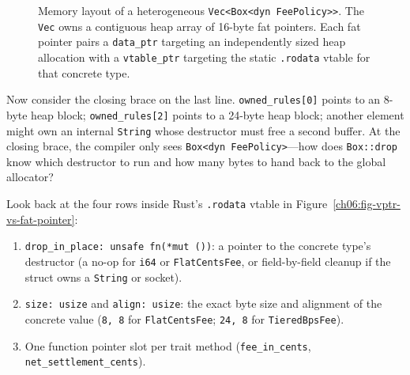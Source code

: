 \begin{figure}[htbp]
\caption{Memory layout of a heterogeneous \texttt{Vec<Box<dyn FeePolicy>>}. The \texttt{Vec} owns a contiguous heap array of 16-byte fat pointers. Each fat pointer pairs a \texttt{data\_ptr} targeting an independently sized heap allocation with a \texttt{vtable\_ptr} targeting the static \texttt{.rodata} vtable for that concrete type.}
\label{ch06:fig-vec-box-dyn}
\end{figure}

Now consider the closing brace on the last line. \texttt{owned\_rules[0]} points to an 8-byte heap block; \texttt{owned\_rules[2]} points to a 24-byte heap block; another element might own an internal \texttt{String} whose destructor must free a second buffer. At the closing brace, the compiler only sees \texttt{Box<dyn FeePolicy>}---how does \texttt{Box::drop} know which destructor to run and how many bytes to hand back to the global allocator?

Look back at the four rows inside Rust's \texttt{.rodata} vtable in Figure~\ref{ch06:fig-vptr-vs-fat-pointer}:
\begin{enumerate}
  \item \texttt{drop\_in\_place: unsafe fn(*mut ())}: a pointer to the concrete type's destructor (a no-op for \texttt{i64} or \texttt{FlatCentsFee}, or field-by-field cleanup if the struct owns a \texttt{String} or socket).
  \item \texttt{size: usize} and \texttt{align: usize}: the exact byte size and alignment of the concrete value (\texttt{8, 8} for \texttt{FlatCentsFee}; \texttt{24, 8} for \texttt{TieredBpsFee}).
  \item One function pointer slot per trait method (\texttt{fee\_in\_cents}, \texttt{net\_settlement\_cents}).
\end{enumerate}

